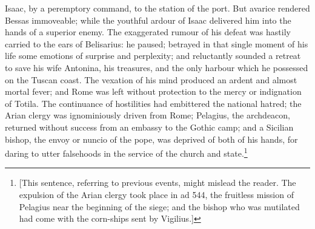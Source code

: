 Isaac, by a peremptory command, to the station of the port. But avarice rendered Bessas immoveable; while the youthful ardour of Isaac delivered him into the hands of a superior enemy. The exaggerated rumour of his defeat was hastily carried to the ears of Belisarius: he paused; betrayed in that single moment of his life some emotions of surprise and perplexity; and reluctantly sounded a retreat to save his wife Antonina, his treasures, and the only harbour which he possessed on the Tuscan coast. The vexation of his mind produced an ardent and almost mortal fever; and Rome was left without protection to the mercy or indignation of Totila. The continuance of hostilities had embittered the national hatred; the Arian clergy was ignominiously driven from Rome; Pelagius, the archdeacon, returned without success from an embassy to the Gothic camp; and a Sicilian bishop, the envoy or nuncio of the pope, was deprived of both of his hands, for daring to utter falsehoods in the service of the church and state.\footnote{[This sentence, referring to previous events, might mislead the reader. The expulsion of the Arian clergy took place in ad 544, the fruitless mission of Pelagius near the beginning of the siege; and the bishop who was mutilated had come with the corn-ships sent by Vigilius.]}

